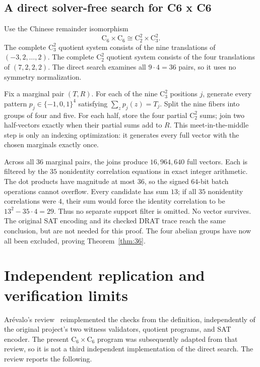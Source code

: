 \documentclass[11pt]{article}
\theoremstyle{remark}
\newcommand{\C}{\mathrm{C}}
\begin{document}
\subsection{A direct solver-free search for C6 x C6}

Use the Chinese remainder isomorphism
\[
    \C_6\times\C_6\cong \C_2^2\times\C_3^2.
\]
The complete $\C_3^2$ quotient system consists of the nine translations of
$(-3,2,\ldots,2)$.  The complete $\C_2^2$ quotient system consists of the four
translations of $(7,2,2,2)$.  The direct search examines all $9\cdot4=36$
pairs, so it uses no symmetry normalization.

Fix a marginal pair $(T,R)$.  For each of the nine $\C_3^2$ positions $j$,
generate every pattern $p_j\in\{-1,0,1\}^4$ satisfying
$\sum_z p_j(z)=T_j$.  Split the nine fibers into groups of four and five.
For each half, store the four partial $\C_2^2$ sums; join two half-vectors
exactly when their partial sums add to $R$.  This meet-in-the-middle step is
only an indexing optimization: it generates every full vector with the chosen
marginals exactly once.

Across all $36$ marginal pairs, the joins produce $16{,}964{,}640$ full
vectors.  Each is filtered by the $35$ nonidentity correlation equations in
exact integer arithmetic.  The dot products have magnitude at most $36$, so
the signed $64$-bit batch operations cannot overflow.  Every candidate has
sum $13$; if all $35$ nonidentity correlations were $4$, their sum would force
the identity correlation to be $13^2-35\cdot4=29$.  Thus no separate support
filter is omitted.  No vector survives.  The original SAT encoding
and its checked DRAT trace reach the same conclusion, but are not needed for
this proof.  The four abelian groups have now all been excluded, proving
Theorem~\ref{thm:36}.

\section{Independent replication and verification limits}

Ar\'evalo's review~\cite{arevalo-review} reimplemented the checks from the
definition, independently of the original project's two witness validators,
quotient programs, and SAT encoder.  The present $\C_6\times\C_6$ program
was subsequently adapted from that review, so it is not a third independent
implementation of the direct search.  The review reports the following.
\end{document}
